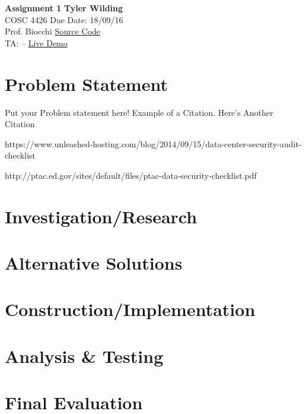 \documentclass[a4paper, 11pt]{article}
\begin{document}
\noindent
\large\textbf{Assignment 1} \hfill \textbf{Tyler Wilding} \\
\normalsize COSC 4426 \hfill Due Date: 18/09/16 \\
Prof. Biocchi \hfill \href{https://github.com/xTVaser/Schoolwork-Fall-2016/tree/master/Internet%20Security/encryption-webapp}{Source Code} \\
TA: -- \hfill \href{http://notturing.ddns.net/tyler/IS_ASS1/index.html}{Live Demo}

\section*{Problem Statement}
Put your Problem statement here! Example of a Citation\cite[p.219]{Robotics}. Here's Another Citation\cite{Flueck}

https://www.unleashed-hosting.com/blog/2014/09/15/data-center-security-audit-checklist

http://ptac.ed.gov/sites/default/files/ptac-data-security-checklist.pdf

\section*{Investigation/Research}
\lipsum[2]

\section*{Alternative Solutions}
\lipsum[3]

\section*{Construction/Implementation}
\lipsum[5]

\section*{Analysis \& Testing}
\lipsum[6]

\section*{Final Evaluation}
\lipsum[7]

%
\end{document}
